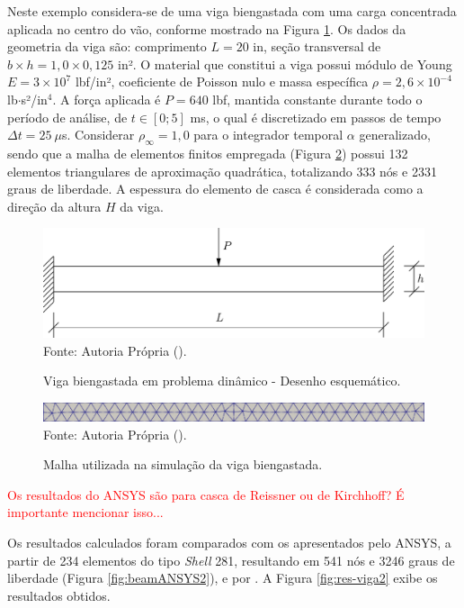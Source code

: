 Neste exemplo considera-se de uma viga biengastada com uma carga concentrada aplicada no centro do vão, conforme mostrado na Figura \ref{fig:viga2}. Os dados da geometria da viga são: comprimento $L=20$ in, seção transversal de $b\times h=1,0\times0,125$ in². O material que constitui a viga possui módulo de Young $E=3\times10^{7}$ lbf/in², coeficiente de Poisson nulo e massa específica $\rho=2,6\times10^{-4}$ lb$\cdot$s²/in$^4$. A força aplicada é $P=640$ lbf, mantida constante durante todo o período de análise, de $t\in[0;5]$ ms, o qual é discretizado em passos de tempo $\Delta t=25\ \mu$s. Considerar $\rho_\infty=1,0$ para o integrador temporal $\alpha$ generalizado, sendo que a malha de elementos finitos empregada (Figura \ref{fig:viga2-mesh}) possui 132 elementos triangulares de aproximação quadrática, totalizando 333 nós e 2331 graus de liberdade. A espessura do elemento de casca é considerada como a direção da altura $H$ da viga.

\begin{figure}[h!]
    \centering
    \caption{Viga biengastada em problema dinâmico - Desenho esquemático.}
    \includegraphics[width=0.6\linewidth]{Figuras/vigas/viga2.pdf}
    \\Fonte: Autoria Própria (\the\year).
    \label{fig:viga2}
\end{figure}

\begin{figure}[h!]
    \centering
    \caption{Malha utilizada na simulação da viga biengastada.}
    \includegraphics[width=\linewidth]{Figuras/vigas/mesh2.png}
    \\Fonte: Autoria Própria (\the\year).
    \label{fig:viga2-mesh}
\end{figure}

\textcolor{red}{Os resultados do ANSYS são para casca de Reissner ou de Kirchhoff? É importante mencionar isso...}

Os resultados calculados foram comparados com os apresentados pelo ANSYS, a partir de 234 elementos do tipo \textit{Shell} 281, resultando em 541 nós e 3246 graus de liberdade (Figura \ref{fig:beamANSYS2}), e por \cite{mondkar1977ansa}. A Figura \ref{fig:res-viga2} exibe os resultados obtidos.

